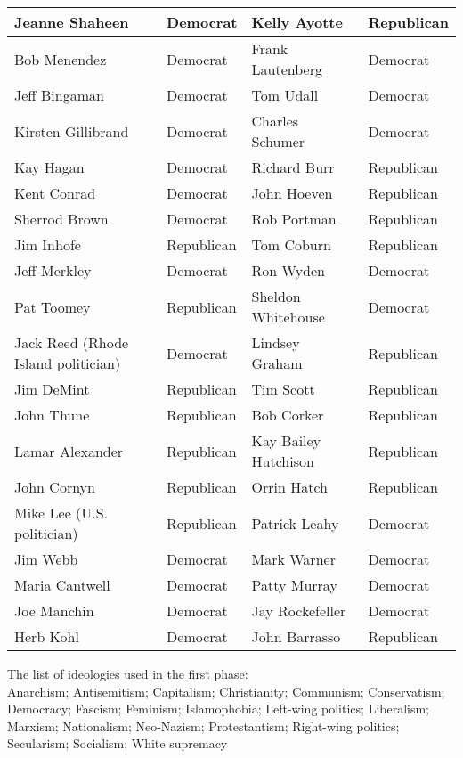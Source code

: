 \documentclass[10pt,11pt,12pt,oneside]{book}
\begin{document}
\begin{appendices}
\begin{table}[H]
\begin{tabular}{|p{2in}|p{0.5in}||p{2in}|p{0.5in}|}
		Jeanne Shaheen & Democrat & Kelly Ayotte & Republican\\ \hline
		Bob Menendez & Democrat & Frank Lautenberg & Democrat\\ \hline
		Jeff Bingaman & Democrat & Tom Udall & Democrat\\ \hline
		Kirsten Gillibrand & Democrat & Charles Schumer & Democrat\\ \hline
		Kay Hagan & Democrat & Richard Burr & Republican\\ \hline
		Kent Conrad & Democrat & John Hoeven & Republican\\ \hline
		Sherrod Brown & Democrat & Rob Portman & Republican\\ \hline
		Jim Inhofe & Republican & Tom Coburn & Republican\\ \hline
		Jeff Merkley & Democrat & Ron Wyden & Democrat\\ \hline
		Pat Toomey & Republican & Sheldon Whitehouse & Democrat\\ \hline
		Jack Reed (Rhode Island politician) & Democrat & Lindsey Graham & Republican\\ \hline
		Jim DeMint & Republican & Tim Scott & Republican\\ \hline
		John Thune & Republican & Bob Corker & Republican\\ \hline
		Lamar Alexander & Republican & Kay Bailey Hutchison & Republican\\ \hline
		John Cornyn & Republican & Orrin Hatch & Republican\\ \hline
		Mike Lee (U.S. politician) & Republican & Patrick Leahy & Democrat\\ \hline
		Jim Webb & Democrat & Mark Warner & Democrat\\ \hline
		Maria Cantwell & Democrat & Patty Murray & Democrat\\ \hline
		Joe Manchin & Democrat & Jay Rockefeller & Democrat\\ \hline
		Herb Kohl & Democrat & John Barrasso & Republican\\ \hline
	\end{tabular}
\end{table}

The list of ideologies used in the first phase:\\
Anarchism; Antisemitism; Capitalism; Christianity; Communism; Conservatism; Democracy; Fascism; Feminism; Islamophobia; Left-wing politics; Liberalism; Marxism; Nationalism; Neo-Nazism; Protestantism; Right-wing politics; Secularism; Socialism; White supremacy


\end{appendices}
\end{document}
